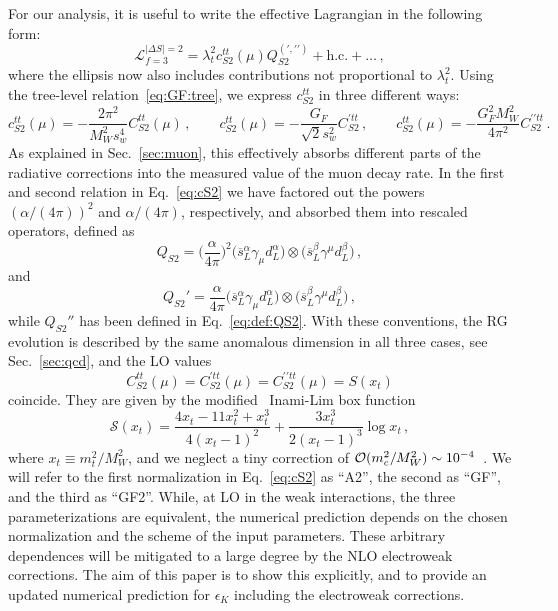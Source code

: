 \documentclass[letter,11pt,DIV=12,abstract=true,numbers=noenddot,titlepage=false,twocolumn=false,draft=false]{scrartcl}
\newcommand{\Sc}{\mathscr{S}}
\begin{document}
For our analysis, it is useful to write the effective
Lagrangian in the following form:
\begin{equation}\label{eq:LS2:g2}
\mathcal{L}^{|\Delta S|=2}_{f=3} = \lambda_t^2 c_{S2}^{tt} (\mu)
Q_{S2}^{(\prime, \prime\prime)} + \textrm{h.c.} + \dots \,,
\end{equation}
where the ellipsis now also includes contributions not proportional to
$\lambda_t^2$. Using the tree-level relation~\eqref{eq:GF:tree}, we
express $c_{S2}^{tt}$ in three different ways:
\begin{equation}\label{eq:cS2}
c_{S2}^{tt} (\mu) = - \frac{2\pi^2}{M_W^2 s_w^4}
C_{S2}^{tt} (\mu)\,,
\qquad
c_{S2}^{tt} (\mu) = - \frac{G_F}{\sqrt{2} s_w^2}
C_{S2}^{\prime tt}\,,
\qquad
c_{S2}^{tt} (\mu) = - \frac{G_F^2 M_W^2}{4 \pi^2}
C_{S2}^{\prime \prime tt}\,.
\end{equation}
As explained in Sec.~\ref{sec:muon}, this effectively absorbs
different parts of the radiative corrections into the measured value
of the muon decay rate. In the first and second relation in
Eq.~\eqref{eq:cS2} we have factored out the powers $(\alpha/(4\pi))^2$
and $\alpha/(4\pi)$, respectively, and absorbed them into rescaled
operators, defined as
\begin{equation}\label{eq:def:QS2:A2}
Q_{S2} =
\bigg(\frac{\alpha}{4\pi}\bigg)^2
\big(\overline{s}_L^\alpha \gamma_{\mu} d_L^\alpha\big) \otimes
\big(\overline{s}_L^\beta \gamma^{\mu}d_L^\beta\big)\,,
\end{equation}
and
\begin{equation}\label{eq:def:QS2:GF}
Q_{S2}' =
\frac{\alpha}{4\pi}
\big(\overline{s}_L^\alpha \gamma_{\mu} d_L^\alpha\big) \otimes
\big(\overline{s}_L^\beta \gamma^{\mu}d_L^\beta\big)\,,
\end{equation}
while $Q_{S2}''$ has been defined in Eq.~\eqref{eq:def:QS2}. With
these conventions, the RG evolution is described by the same anomalous
dimension in all three cases, see Sec.~\ref{sec:qcd}, and the LO
values
\begin{equation}
C_{S2}^{tt} (\mu) = C_{S2}^{\prime tt} (\mu) = C_{S2}^{\prime \prime tt} (\mu) = S(x_t)
\end{equation}
coincide. They are given by the modified~\cite{Brod:2019rzc} Inami-Lim
box function~\cite{Inami:1980fz}
\begin{equation}
\Sc(x_t) = \frac{4 x_t - 11 x_t^2 + x_t^3}{4(x_t-1)^2}
         + \frac{3 x_t^3}{2(x_t-1)^3} \log x_t \,,
\end{equation}
where $x_t \equiv m_t^2/M_W^2$, and we neglect a tiny correction of
${\cal O}(m_c^2/M_W^2) \sim 10^{-4}$~\cite{Brod:2019rzc}. We will
refer to the first normalization in Eq.~\eqref{eq:cS2} as ``A2'', the
second as ``GF'', and the third as ``GF2''. While, at LO in the weak
interactions, the three parameterizations are equivalent, the
numerical prediction depends on the chosen normalization and the
scheme of the input parameters. These arbitrary dependences will be
mitigated to a large degree by the NLO electroweak corrections. The
aim of this paper is to show this explicitly, and to provide an
updated numerical prediction for $\epsilon_K$ including the
electroweak corrections.
\end{document}

